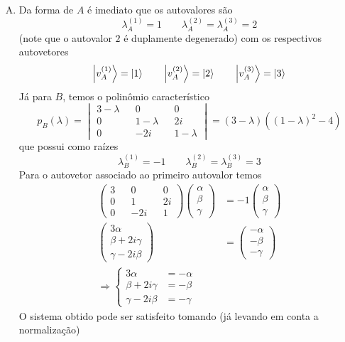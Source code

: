 \documentclass[a4paper, 12pt, notitlepage]{article}
\begin{document}
\begin{enumerate}
\begin{enumerate}[(A)]
  \item Da forma de $A$ é imediato que os autovalores são 
  \[\lambda_A^{(1)} = 1 \qquad \lambda_A^{(2)} = \lambda_A^{(3)} = 2 \]
  \noindent (note que o autovalor $2$ é duplamente degenerado) com os respectivos autovetores
  \[ \ket{v_A^{(1)}} = \ket{1} \qquad \ket{v_A^{(2)}} = \ket{2} \qquad \ket{v_A^{(3)}} = \ket{3} \]
  Já para $B$, temos o polinômio característico
  \[ p_B(\lambda) = \begin{vmatrix}
  3 - \lambda && 0 && 0 \\
  0 && 1-\lambda && 2i \\
  0 && -2i && 1-\lambda
  \end{vmatrix} = (3-\lambda)((1 - \lambda)^2 - 4) \]
  \noindent que possui como raízes
  \[ \lambda_B^{(1)} = -1 \qquad \lambda_B^{(2)} = \lambda_B^{(3)} = 3 \]
  Para o autovetor associado ao primeiro autovalor temos
  \begin{align*}
    \begin{pmatrix}
    3 && 0 && 0 \\
    0 && 1 && 2i \\
    0 && -2i && 1
    \end{pmatrix}
    \begin{pmatrix}
    \alpha \\ \beta \\ \gamma
    \end{pmatrix}
    &= -1\begin{pmatrix}\alpha \\ \beta \\ \gamma \end{pmatrix} \\
    \begin{pmatrix} 3\alpha \\ \beta + 2i \gamma \\ \gamma - 2i \beta \end{pmatrix} &= \begin{pmatrix} -\alpha \\ -\beta \\ -\gamma    \end{pmatrix} \\
    \Rightarrow \begin{cases}
    3 \alpha &= -\alpha \\
    \beta + 2i \gamma &= -\beta \\
    \gamma - 2i \beta &= -\gamma
    \end{cases}
  \end{align*}
  O sistema obtido pode ser satisfeito tomando (já levando em conta a normalização)

\end{enumerate}
\end{enumerate}
\end{document}
